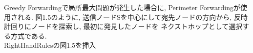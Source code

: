 Greedy Forwardingで局所最大問題が発生した場合に, 
Perimeter Forwardingが使用される. 
図1.5のように, 送信ノードSを中心にして宛先ノードの方向から,  
反時計回りにノードを探索し, 最初に発見したノードを
ネクストホップとして選択する方式である.\\

{\LARGE RightHandRulesの図1.5を挿入}